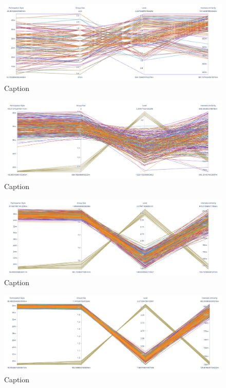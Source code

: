 \begin{figure}
    \centering
    \includegraphics[width=\textwidth]{images/para_soa_20.png}
    \caption{Caption}
    \label{fig:my_label}
\end{figure}

\begin{figure}
    \centering
    \includegraphics[width=\textwidth]{images/para_soa_200.png}
    \caption{Caption}
    \label{fig:my_label}
\end{figure}

\begin{figure}
    \centering
    \includegraphics[width=\textwidth]{images/para_soa_2000.png}
    \caption{Caption}
    \label{fig:my_label}
\end{figure}

\begin{figure}
    \centering
    \includegraphics[width=\textwidth]{images/para_soa_10001.png}
    \caption{Caption}
    \label{fig:my_label}
\end{figure}

